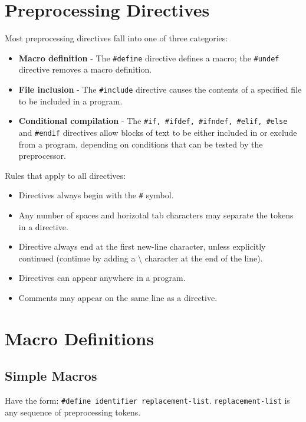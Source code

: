 \documentclass[openany]{book}
\begin{document}
    \section{Preprocessing Directives}
    
    Most preprocessing directives fall into one of three categories:
    \begin{itemize}
        \item \textbf{Macro definition} - The \texttt{\#define} directive defines a macro; the \texttt{\#undef} directive removes a macro definition.
        \item \textbf{File inclusion} - The \texttt{\#include} directive causes the contents of a specified file to be included in a program.
        \item \textbf{Conditional compilation} - The \texttt{\#if, \#ifdef, \#ifndef, \#elif, \#else} and \texttt{\#endif} directives allow blocks of text to be either included in or exclude from a program, depending on conditions that can be tested by the preprocessor.
    \end{itemize}

    \bigskip

    Rules that apply to all directives:
    \begin{itemize}
        \item Directives always begin with the \texttt{\#} symbol.
        \item Any number of spaces and horizotal tab characters may separate the tokens in a directive.
        \item Directive always end at the first new-line character, unless explicitly continued (continue by adding a \textbackslash \phantom{ } character at the end of the line).
        \item Directives can appear anywhere in a program.
        \item Comments may appear on the same line as a directive.
    \end{itemize}

    \section{Macro Definitions}

    \subsection*{Simple Macros}

    Have the form: \texttt{\#define identifier replacement-list}. \texttt{replacement-list} is any sequence of preprocessing tokens.
\end{document}
